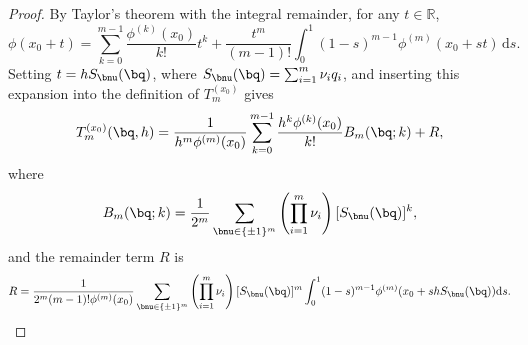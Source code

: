 \documentclass[11pt]{article}
\begin{document}
\begin{proof}
    By Taylor’s theorem with the integral remainder, for any $t \in \mathbb{R}$,
    \begin{equation*}
        \phi(x_0 + t)
        = \sum_{k=0}^{m-1} \frac{\phi^{(k)}(x_0)}{k!} t^k
        + \frac{t^m}{(m-1)!} 
          \int_0^1 (1-s)^{m-1} \phi^{(m)}(x_0 + s t)\, \mathrm{d}s.
    \end{equation*}
    Setting $t = h S_{\bnu}(\bq) $, where $S_{\bnu}(\bq)= \sum_{i=1}^m \nu_i q_i$, and inserting this expansion into the definition of $T_{m}^{(x_0)}$ gives
    \begin{equation}
         T_{m}^{(x_0)}(\bq,h) = \frac{1}{h^m \phi^{(m)}(x_0)} \sum_{k=0}^{m-1} \frac{ h^k\phi^{(k)}(x_0)}{k!} B_m(\bq; k) + R, 
         \label{eq:expansion_Tm}
    \end{equation} 
    where 
    \begin{equation*}
        B_{{m}}(\bq; k) = \frac{1}{2^m} \sum_{\bnu \in  \{\pm1\}^m} \left( \prod_{i=1}^m \nu_i\right) [S_{\bnu}(\bq)]^k,
    \end{equation*}
    and the remainder term $R$ is 
    \begin{equation*}
        R = \frac{1}{2^m (m-1)! \phi^{(m)}(x_0)} \sum_{\bnu \in \{\pm 1\}^m} \left( \prod_{i=1}^m \nu_i\right) [S_{\bnu}(\bq)]^m\int_0^1 (1 - s)^{m-1} \phi^{(m)}(x_0 + s h S_{\bnu}(\bq)) \mathrm{d } s. 
    \end{equation*}


\end{proof}
\end{document}
